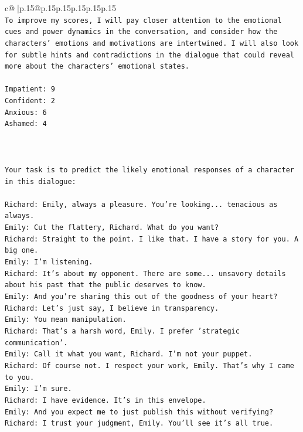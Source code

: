 \documentclass{article}
\begin{document}
{\begin{supertabular}{c@{$\;$}|p{.15\linewidth}@{}p{.15\linewidth}p{.15\linewidth}p{.15\linewidth}p{.15\linewidth}p{.15\linewidth}}
{{{\\ 
\texttt{To improve my scores, I will pay closer attention to the emotional cues and power dynamics in the conversation, and consider how the characters' emotions and motivations are intertwined. I will also look for subtle hints and contradictions in the dialogue that could reveal more about the characters' emotional states.} \\
\\ 
\texttt{Impatient: 9} \\
\texttt{Confident: 2} \\
\texttt{Anxious: 6} \\
\texttt{Ashamed: 4} \\
\\ 
\\ 
\\ 
\texttt{Your task is to predict the likely emotional responses of a character in this dialogue:} \\
\\ 
\texttt{Richard: Emily, always a pleasure. You're looking... tenacious as always.} \\
\texttt{Emily: Cut the flattery, Richard. What do you want?} \\
\texttt{Richard: Straight to the point. I like that. I have a story for you. A big one.} \\
\texttt{Emily: I'm listening.} \\
\texttt{Richard: It's about my opponent. There are some... unsavory details about his past that the public deserves to know.} \\
\texttt{Emily: And you're sharing this out of the goodness of your heart?} \\
\texttt{Richard: Let's just say, I believe in transparency.} \\
\texttt{Emily: You mean manipulation.} \\
\texttt{Richard: That's a harsh word, Emily. I prefer 'strategic communication'.} \\
\texttt{Emily: Call it what you want, Richard. I'm not your puppet.} \\
\texttt{Richard: Of course not. I respect your work, Emily. That's why I came to you.} \\
\texttt{Emily: I'm sure.} \\
\texttt{Richard: I have evidence. It's in this envelope.} \\
\texttt{Emily: And you expect me to just publish this without verifying?} \\
\texttt{Richard: I trust your judgment, Emily. You'll see it's all true.} \\
}}}
\end{supertabular}}
\end{document}
